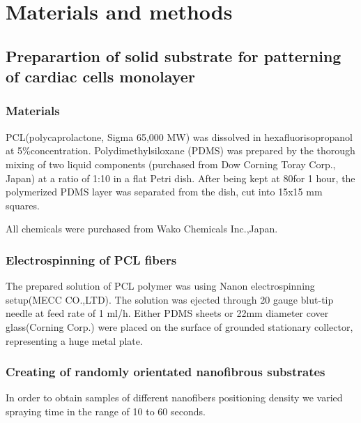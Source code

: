 \section{Materials and methods}
\label{sec:methods}

\subsection{Preparartion of solid substrate for patterning of cardiac cells monolayer}
\subsubsection{Materials}
	\label{sec:specimen_preparation_electrospinning}


PCL(polycaprolactone, Sigma 65,000 MW) was dissolved in hexafluorisopropanol at 5\%concentration.  
Polydimethylsiloxane (PDMS) was prepared by the thorough mixing of two liquid components (purchased from Dow Corning Toray Corp., Japan) at a ratio of 1:10 in a flat Petri dish. After being kept at 80\gc\space for 1 hour, the polymerized PDMS layer was separated from the dish, cut into 15x15 mm squares.

All chemicals were purchased from Wako Chemicals Inc.,Japan.
\subsubsection{Electrospinning of PCL fibers}
The prepared solution of PCL polymer was using Nanon electrospinning setup(MECC CO.,LTD). The solution was ejected through 20 gauge blut-tip needle at feed rate of 1 ml/h. Either PDMS sheets or 22mm diameter cover glass(Corning Corp.) were placed on the surface of grounded stationary collector, representing a huge metal plate.    
\subsubsection{Creating of randomly orientated nanofibrous substrates }
In order to obtain samples of different nanofibers positioning density we varied spraying time in the range of 10 to 60 seconds.   

